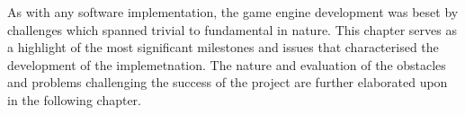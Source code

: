 \documentclass[11pt, a4paper, oneside]{report} %
\begin{document}
As with any software implementation, the game engine development was beset by
challenges which spanned trivial to fundamental in nature. This chapter serves
as a highlight of the most significant milestones and issues that characterised
the development of the implemetnation. The nature and evaluation of the
obstacles and problems challenging the success of the project are further
elaborated upon in the following chapter.









\end{document}
